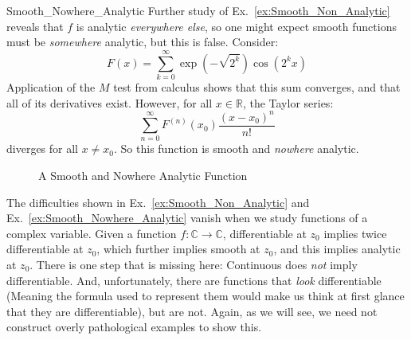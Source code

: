     \begin{lexample}{}{Smooth_Nowhere_Analytic}
        Further study of Ex.~\ref{ex:Smooth_Non_Analytic} reveals that
        $f$ is analytic \textit{everywhere else}, so one might expect
        smooth functions must be \textit{somewhere} analytic, but
        this is false. Consider:
        \begin{equation}
            F(x)=\sum_{k=0}^{\infty}\exp(\minus\sqrt{2^{k}})\cos(2^{k}x)
        \end{equation}
        Application of the $M$ test from calculus shows that this sum
        converges, and that all of its derivatives exist. However, for
        all $x\in\mathbb{R}$, the Taylor series:
        \begin{equation}
            \sum_{n=0}^{\infty}
                F^{(n)}(x_{0})\frac{(x-x_{0})^{n}}{n!}
        \end{equation}
        diverges for all $x\ne{x}_{0}$. So this function is smooth
        and \textit{nowhere} analytic.
    \end{lexample}
    \begin{figure}[H]
        \centering
        
        \caption{A Smooth and Nowhere Analytic Function}
        \label{fig:Smooth_But_Non_Analytic}
    \end{figure}
    The difficulties shown in Ex.~\ref{ex:Smooth_Non_Analytic} and
    Ex.~\ref{ex:Smooth_Nowhere_Analytic} vanish when we study functions
    of a complex variable. Given a function
    $f:\mathbb{C}\rightarrow\mathbb{C}$, differentiable at $z_{0}$
    implies twice differentiable at $z_{0}$, which further implies
    smooth at $z_{0}$, and this implies analytic at $z_{0}$. There is
    one step that is missing here: Continuous does \textit{not} imply
    differentiable. And, unfortunately, there are functions that
    \textit{look} differentiable (Meaning the formula used to represent
    them would make us think at first glance that they are
    differentiable), but are not. Again, as we will see, we need not
    construct overly pathological examples to show this.
